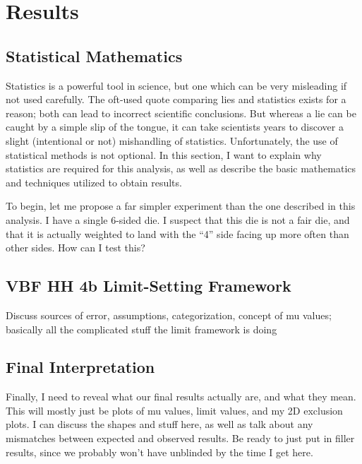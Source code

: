\chapter{Results} \label{chapter:results}

\section{Statistical Mathematics}

    Statistics is a powerful tool in science,
        but one which can be very misleading if not used carefully.
    The oft-used quote comparing lies and statistics exists for a reason;
        both can lead to incorrect scientific conclusions.
    But whereas a lie can be caught by a simple slip of the tongue,
        it can take scientists years to discover a slight (intentional or not) mishandling of statistics.
    Unfortunately, the use of statistical methods is not optional.
    In this section, I want to explain why statistics are required for this analysis,
        as well as describe the basic mathematics and techniques utilized to obtain results.

    To begin, let me propose a far simpler experiment than the one described in this analysis.
    I have a single 6-sided die.
    I suspect that this die is not a fair die,
        and that it is actually weighted to land with the ``4'' side facing up more often than other sides.
    How can I test this?
        


\section{VBF \to HH \to 4b Limit-Setting Framework}

    Discuss sources of error, assumptions, categorization, concept of mu values;
    basically all the complicated stuff the limit framework is doing

\section{Final Interpretation}

    Finally, I need to reveal what our final results actually are, and what they mean.
    This will mostly just be plots of mu values, limit values, and my 2D exclusion plots.
    I can discuss the shapes and stuff here, as well as talk about any mismatches between expected and observed results.
    Be ready to just put in filler results, since we probably won't have unblinded by the time I get here.


